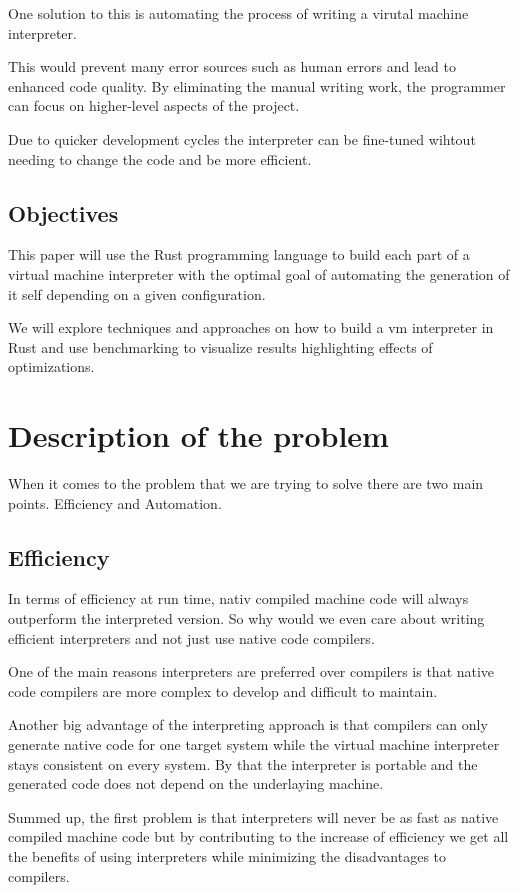 \documentclass{article}
\begin{document}
One solution to this is automating the process of writing a virutal machine
interpreter.

This would prevent many error sources such as human errors and lead to enhanced
code quality. By eliminating the manual writing work, the programmer can focus
on higher-level aspects of the project.

Due to quicker development cycles the interpreter can be fine-tuned wihtout
needing to change the code and be more efficient.

\subsection{Objectives}
This paper will use the Rust programming language to build each part of a virtual machine 
interpreter with the optimal goal of automating the generation of it self depending on
a given configuration.

We will explore techniques and approaches on how to build a vm interpreter in
Rust and use benchmarking to visualize results highlighting effects of
optimizations.

\section{Description of the problem}
When it comes to the problem that we are trying to solve there are two main
points. Efficiency and Automation.

\subsection{Efficiency}
In terms of efficiency at run time, nativ compiled machine code will always
outperform the interpreted version. So why would we even care about writing
efficient interpreters and not just use native code compilers.

One of the main reasons interpreters are preferred over compilers is that 
native code compilers are more complex to develop and difficult to maintain.
~\cite{structure_and_performance}

Another big advantage of the interpreting approach is that compilers can only
generate native code for one target system while the virtual machine
interpreter stays consistent on every system. By that the interpreter is
portable and the generated code does not depend on the underlaying machine.

Summed up, the first problem is that interpreters will never be as fast as
native compiled machine code but by contributing to the increase of efficiency
we get all the benefits of using interpreters while minimizing the
disadvantages to compilers.
\end{document}
